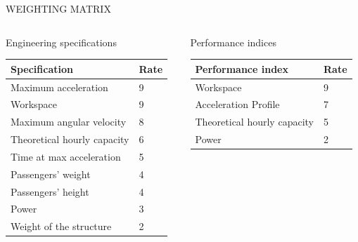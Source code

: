 \documentclass{beamer}              %
\begin{document}
	\begin{frame}{WEIGHTING MATRIX }
		\small
		
		\begin{columns}
			\begin{column}[t]{0.5\textwidth}
				\begin{block}{\small \centering Engineering specifications}
					
					\medskip
					
					\begin{tabular}{ll}
						\toprule
						\textbf{Specification} & \textbf{Rate} \\
						\toprule
						Maximum acceleration & 9 \\
						Workspace & 9 \\
						Maximum angular velocity & 8 \\
						Theoretical hourly capacity & 6 \\
						Time at max acceleration &  5\\
						Passengers' weight& 4\\			
						Passengers' height & 4 \\		
						Power & 3\\											
						Weight of the structure& 2 \\	
						\bottomrule
					\end{tabular}
				\end{block}	
			\end{column}
		\begin{column}[t]{0.5\textwidth}
			\begin{block}{\small \centering Performance indices}
				
				\medskip
				
				\begin{tabular}{ll}
					\toprule
					\textbf{Performance index}  & \textbf{Rate} \\
					\toprule					
					Workspace & 9 \\
					Acceleration Profile & 7 \\						
					Theoretical hourly capacity & 5 \\		
					Power & 2 \\		
					\bottomrule
				\end{tabular}
			\end{block}
			\end{column}
		\end{columns}
	\end{frame}
\end{document}
